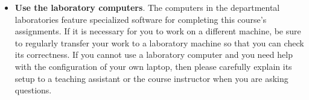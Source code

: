 \documentclass[11pt]{article}
\newcommand{\command}[1]{``\lstinline{#1}''}
\begin{document}
\begin{itemize}
  \setlength{\itemsep}{0pt}

\item {\bf Use the laboratory computers}. The computers in the departmental
  laboratories feature specialized software for completing this course's
  assignments. If it is necessary for you to work on a different machine, be
  sure to regularly transfer your work to a laboratory machine so that you can
  check its correctness. If you cannot use a laboratory computer and you need
  help with the configuration of your own laptop, then please carefully explain
  its setup to a teaching assistant or the course instructor when you are asking
  questions.






\end{itemize}
\end{document}
